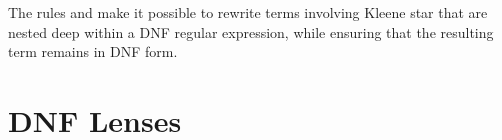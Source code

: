 \documentclass[numbers,10pt,preprint\ifanon ,nocopyrightspace\fi]{sigplanconf}
\begin{document}
The rules \AtomStructuralRewriteRule{} and \DNFStructuralRewriteRule{}
make it possible to rewrite terms involving Kleene star that are
nested deep within a DNF regular expression, while ensuring that the
resulting term remains in DNF form.


\section{DNF Lenses}
\label{sec:dnf}
\end{document}
